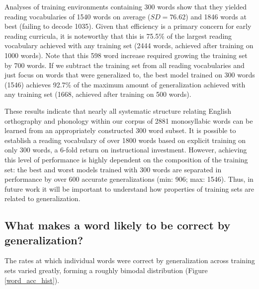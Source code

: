 \documentclass[10pt,letterpaper]{article}
\begin{document}
Analyses of training environments containing 300 words show that they yielded reading vocabularies of 1540 words on average ($SD = 76.62$) and 1846 words at best (failing to decode 1035). Given that efficiency is a primary concern for early reading curricula, it is noteworthy that this is 75.5\% of the largest reading vocabulary achieved with any training set (2444 words, achieved after training on 1000 words). Note that this 598 word increase required growing the training set by 700 words. If we subtract the training set from all reading vocabularies and just focus on words that were generalized to, the best model trained on 300 words (1546) achieves 92.7\% of the maximum amount of generalization achieved with any training set (1668, achieved after training on 500 words).

These results indicate that nearly all systematic structure relating English orthography and phonology within our corpus of 2881 monosyllabic words can be learned from an appropriately constructed 300 word subset. It is possible to establish a reading vocabulary of over 1800 words based on explicit training on only 300 words, a 6-fold return on instructional investment. However, achieving this level of performance is highly dependent on the composition of the training set: the best and worst models trained with 300 words are separated in performance by over 600 accurate generalizations (min: 906; max: 1546). Thus, in future work it will be important to understand how properties of training sets are related to generalization.   

\subsection{What makes a word likely to be correct by generalization?}
The rates at which individual words were correct by generalization across training sets varied greatly, forming a roughly bimodal distribution (Figure \ref{word_acc_hist}).
\end{document}
